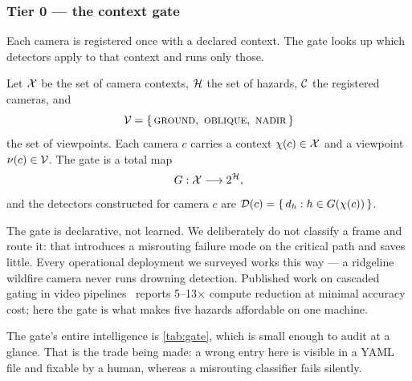 \subsubsection{Tier 0 — the context gate}
\label{sec:gate}

Each camera is registered once with a declared context. The gate looks up
which detectors apply to that context and runs only those.

\begin{definition}[Gate]
\label{def:gate}
Let $\mathcal{X}$ be the set of camera contexts, $\mathcal{H}$ the set of hazards,
$\mathcal{C}$ the registered cameras, and
\[
  \viewpoints = \{\,\textsc{ground},\ \textsc{oblique},\ \textsc{nadir}\,\}
\]
the set of viewpoints. Each camera $c$ carries
a context $\chi(c) \in \mathcal{X}$ and a viewpoint $\nu(c) \in \mathcal{V}$.
The gate is a total map
\[
  G : \mathcal{X} \longrightarrow 2^{\mathcal{H}},
\]
and the detectors constructed for camera $c$ are
$\mathcal{D}(c) = \{\, d_h : h \in G(\chi(c)) \,\}$.
\end{definition}

The gate is declarative, not learned. We deliberately do not classify a frame
and route it: that introduces a misrouting failure mode on the critical path
and saves little. Every operational deployment we surveyed works this way — a
ridgeline wildfire camera never runs drowning detection. Published work on
cascaded gating in video pipelines~\citep{kang2017noscope,mao2018catdet}
reports 5--13$\times$ compute reduction at minimal accuracy cost; here the
gate is what makes five hazards affordable on one machine.

The gate's entire intelligence is \cref{tab:gate}, which is small enough to
audit at a glance. That is the trade being made: a wrong entry here is visible
in a YAML file and fixable by a human, whereas a misrouting classifier fails
silently.

